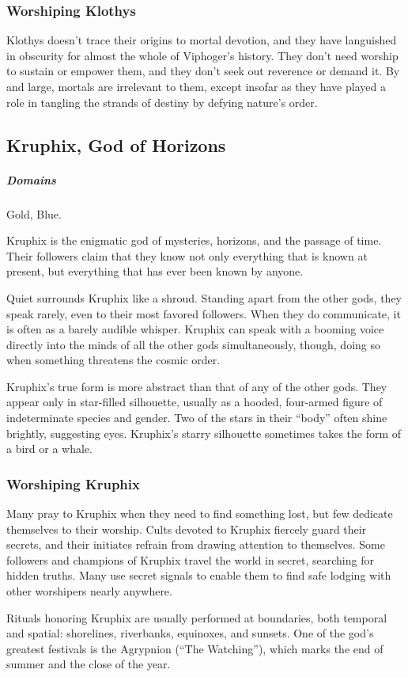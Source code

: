 
    \subsubsection{Worshiping Klothys}
        Klothys doesn't trace their origins to mortal devotion, and they have languished in obscurity for almost the whole of Viphoger's history.
        They don't need worship to sustain or empower them, and they don't seek out reverence or demand it.
        By and large, mortals are irrelevant to them, except insofar as they have played a role in tangling the strands of destiny by defying nature's order.

\subsection*{Kruphix, God of Horizons} \label{ssec::kruphix}
    \subparagraph{Domains} Gold, Blue.

    Kruphix is the enigmatic god of mysteries, horizons, and the passage of time.
    Their followers claim that they know not only everything that is known at present, but everything that has ever been known by anyone.

    Quiet surrounds Kruphix like a shroud.
    Standing apart from the other gods, they speak rarely, even to their most favored followers.
    When they do communicate, it is often as a barely audible whisper.
    Kruphix can speak with a booming voice directly into the minds of all the other gods simultaneously, though, doing so when something threatens the cosmic order.

    Kruphix's true form is more abstract than that of any of the other gods.
    They appear only in star-filled silhouette, usually as a hooded, four-armed figure of indeterminate species and gender.
    Two of the stars in their ``body'' often shine brightly, suggesting eyes.
    Kruphix's starry silhouette sometimes takes the form of a bird or a whale.


    \subsubsection{Worshiping Kruphix}
        Many pray to Kruphix when they need to find something lost, but few dedicate themselves to their worship.
        Cults devoted to Kruphix fiercely guard their secrets, and their initiates refrain from drawing attention to themselves.
        Some followers and champions of Kruphix travel the world in secret, searching for hidden truths.
        Many use secret signals to enable them to find safe lodging with other worshipers nearly anywhere.

        Rituals honoring Kruphix are usually performed at boundaries, both temporal and spatial: shorelines, riverbanks, equinoxes, and sunsets.
        One of the god's greatest festivals is the Agrypnion (``The Watching''), which marks the end of summer and the close of the year.
